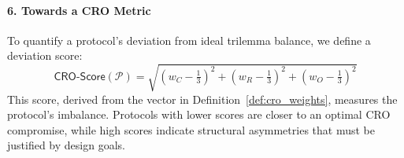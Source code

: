 \documentclass[preprint,12pt]{elsarticle}
\begin{document}
            \paragraph{6. Towards a CRO Metric}
                To quantify a protocol's deviation from ideal trilemma balance, we define a deviation score:
                \begin{equation}\label{eq:cro_metricc}
                    \mathsf{CRO\text{-}Score}(\mathcal{P}) = \sqrt{(w_C - \tfrac{1}{3})^2 + (w_R - \tfrac{1}{3})^2 + (w_O - \tfrac{1}{3})^2}
                \end{equation}
                This score, derived from the vector in Definition~\ref{def:cro_weights}, measures the protocol's imbalance. Protocols with lower scores are closer to an optimal CRO compromise, while high scores indicate structural asymmetries that must be justified by design goals.
\end{document}
